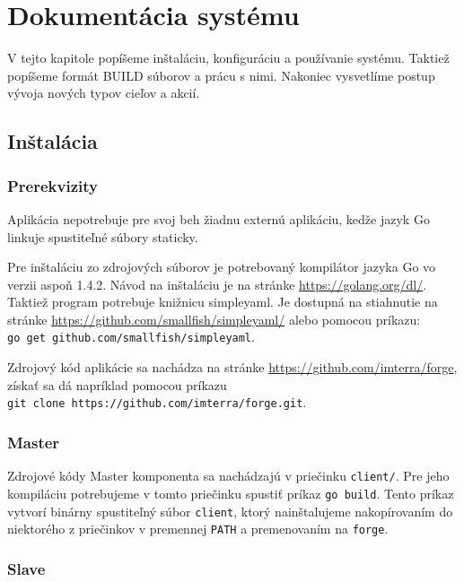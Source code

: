 \chapter{Dokument\'{a}cia syst\'{e}mu}
\label{ch:doc}

V tejto kapitole popíšeme inštaláciu, konfiguráciu a používanie systému. Taktiež
popíšeme formát BUILD súborov a prácu s nimi. Nakoniec vysvetlíme postup vývoja
nových typov cieľov a akcií.

\section{In\v{s}tal\'{a}cia}
\label{sec:installation}

\subsection{Prerekvizity}
\label{sec:installation:dependencies}

Aplikácia nepotrebuje pre svoj beh žiadnu externú aplikáciu, kedže jazyk Go linkuje
spustiteľné súbory staticky.

Pre inštaláciu zo zdrojových súborov je potrebovaný kompilátor jazyka Go vo verzii
aspoň 1.4.2. Návod na inštaláciu je na stránke \url{https://golang.org/dl/}. Taktiež
program potrebuje knižnicu simpleyaml. Je dostupná na stiahnutie na stránke
\url{https://github.com/smallfish/simpleyaml/} alebo pomocou príkazu: \\
\verb!go get github.com/smallfish/simpleyaml!.

Zdrojový kód aplikácie sa nachádza na stránke \url{https://github.com/imterra/forge},
získať sa dá napríklad pomocou príkazu \\
  \verb!git clone https://github.com/imterra/forge.git!.

\subsection{Master}
\label{sec:installation:master}

Zdrojové kódy Master komponenta sa nachádzajú v priečinku \texttt{client/}. Pre jeho
kompiláciu potrebujeme v tomto priečinku spustiť príkaz \verb!go build!. Tento príkaz
vytvorí binárny spustiteľný súbor \texttt{client}, ktorý nainštalujeme nakopírovaním
do niektorého z priečinkov v premennej \texttt{PATH} a premenovaním na \texttt{forge}.

\subsection{Slave}
\label{sec:installation:slave}


